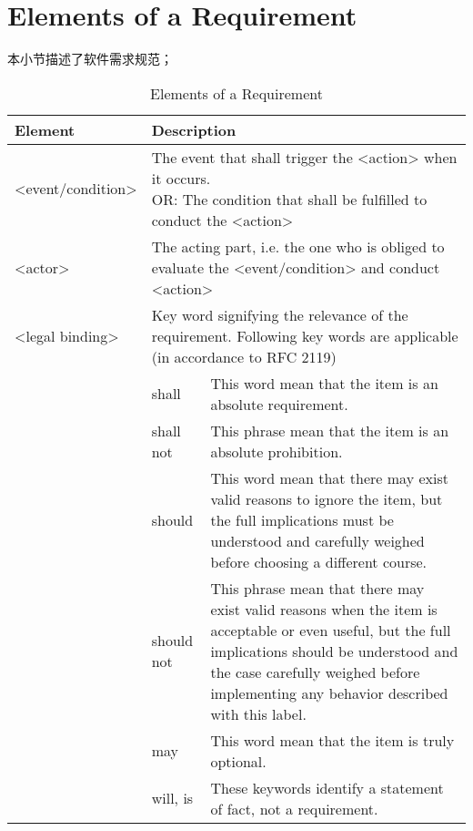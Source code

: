 \newpage
\section{Elements of a Requirement}
	本小节描述了软件需求规范；

	\begin{table}[h]
		\renewcommand{\arraystretch}{1.3}
		\centering
		\caption{Elements of a Requirement}
		\begin{tabular}{|p{2.5cm}|p{2cm}|p{6cm}|}  
			\specialrule{0.2em}{0pt}{0pt} 
			\centering \cellcolor{mygray} \textbf{Element}  & \multicolumn{2}{l|}{\cellcolor{mygray} \textbf{Description}}  \\    
			\hline
			\textcolor{winered}{<event/condition>}  & \multicolumn{2}{p{8cm}|}{The event that shall trigger the \textcolor{mygreen1}{<action>} when it occurs. \newline OR: The condition that shall be fulfilled to conduct the \textcolor{mygreen1}{<action>}} \\
			\hline
			\textcolor{mybule}{<actor>}  & \multicolumn{2}{p{8cm}|}{The acting part, i.e. the one who is obliged to evaluate the \textcolor{winered}{<event/condition>} and conduct \textcolor{mygreen1}{<action>}} \\
			\hline
			\textcolor{mypurple}{<legal binding>}   &  \multicolumn{2}{p{8cm}|}{Key word signifying the relevance of the requirement. Following key words are applicable (in accordance to RFC 2119)} \\
			\cline{2-3}
						&shall       & This word mean that the item is an absolute requirement. \\
						&shall not   & This phrase mean that the item is an absolute prohibition.\\
						&should      &This word mean that there may exist valid reasons to ignore
						the item, but the full implications must be understood and
						carefully weighed before choosing a different course.\\
						&should not           &This phrase mean that there may exist valid reasons
						when the item is acceptable or even useful, but the full
						implications should be understood and the case carefully
						weighed before implementing any behavior described with
						this label.\\
						&may          &This word mean that the item is truly optional.\\
						&will, is           &These keywords identify a statement of fact, not a
						requirement.\\

\end{tabular}
\end{table}
